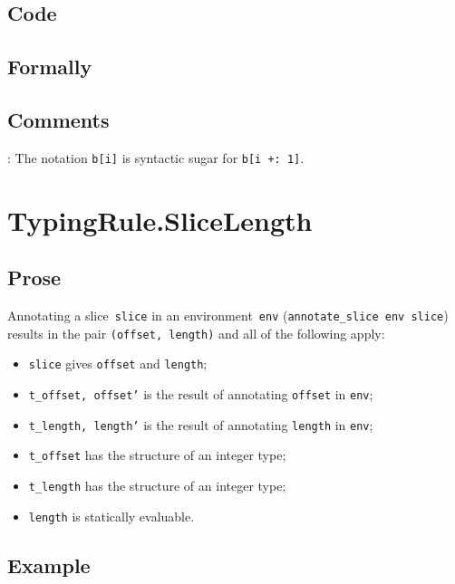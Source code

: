 \documentclass{book}
\begin{document}
  \subsection{Code}

\begin{emptyformal}
    \subsection{Formally}
\end{emptyformal}

\subsection{Comments}
    : The notation \texttt{b[i]} is syntactic sugar for \texttt{b[i +: 1]}.

\section{TypingRule.SliceLength \label{sec:TypingRule.SliceLength}}

  \subsection{Prose}
   Annotating a slice~\texttt{slice} in an environment~\texttt{env}
(\texttt{annotate\_slice env slice}) results in the pair \texttt{(offset,
length)} and all of the following apply:
   \begin{itemize}
   \item \texttt{slice} gives \texttt{offset} and \texttt{length}; 
   \item \texttt{t\_offset, offset'} is the result of annotating \texttt{offset} in \texttt{env};
   \item \texttt{t\_length, length'} is the result of annotating \texttt{length} in \texttt{env};
   \item \texttt{t\_offset} has the structure of an integer type;
   \item \texttt{t\_length} has the structure of an integer type;
   \item \texttt{length} is statically evaluable.
   \end{itemize}

  \subsection{Example}
\end{document}
